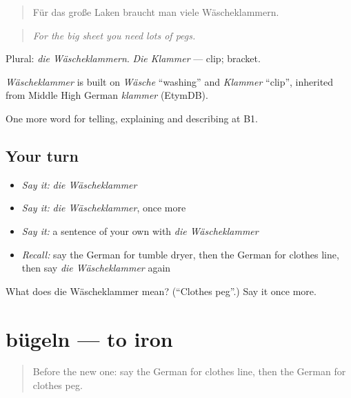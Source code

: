 \begin{quote}
Für das große Laken braucht man viele Wäscheklammern.
\end{quote}

\begin{quote}
\emph{For the big sheet you need lots of pegs.}
\end{quote}

Plural: \emph{die Wäscheklammern}. \emph{Die Klammer} — clip; bracket.

\begin{cousinweb}
\emph{Wäscheklammer} is built on \emph{Wäsche} \textquotedblleft{}washing\textquotedblright{} and \emph{Klammer} \textquotedblleft{}clip\textquotedblright{}, inherited from Middle High German \emph{klammer} (EtymDB).
\end{cousinweb}

\begin{grammarlens}[title={What you've built}]
One more word for telling, explaining and describing at B1.
\end{grammarlens}

\subsection*{Your turn}
\begin{itemize}
\raggedright
  \item \emph{Say it:} \emph{die Wäscheklammer}
  \item \emph{Say it:} \emph{die Wäscheklammer}, once more
  \item \emph{Say it:} a sentence of your own with \emph{die Wäscheklammer}
  \item \emph{Recall:} say the German for tumble dryer, then the German for clothes line, then say \emph{die Wäscheklammer} again
\end{itemize}

\begin{tcolorbox}[breakable,colback=teal!4,colframe=teal!35!black,title={Before you move on}]
What does die Wäscheklammer mean? (\textquotedblleft{}Clothes peg\textquotedblright{}.) Say it once more.
\end{tcolorbox}
\section[bügeln]{bügeln — to iron}

\label{lesson:GE-C527-buegeln}



\begin{quote}
Before the new one: say the German for clothes line, then the German for clothes peg.
\end{quote}

